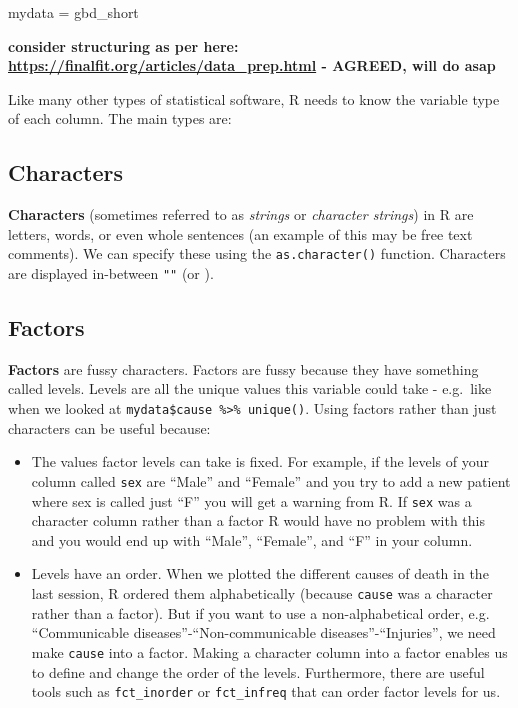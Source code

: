 \documentclass[12pt,]{krantz}
\makeatletter
\newenvironment{Shaded}{\begin{snugshade}}{\end{snugshade}}
\newcommand{\NormalTok}[1]{#1}
\newcommand{\StringTok}[1]{\textcolor[rgb]{0.31,0.60,0.02}{#1}}
\providecommand{\tightlist}{%
  \setlength{\itemsep}{0pt}\setlength{\parskip}{0pt}}
\newenvironment{kframe}{%
\medskip{}
\setlength{\fboxsep}{.8em}
 \def\at@end@of@kframe{}%
 \ifinner\ifhmode%
  \def\at@end@of@kframe{\end{minipage}}%
  \begin{minipage}{\columnwidth}%
 \fi\fi%
 \def\FrameCommand##1{\hskip\@totalleftmargin \hskip-\fboxsep
 \colorbox{shadecolor}{##1}\hskip-\fboxsep
     \hskip-\linewidth \hskip-\@totalleftmargin \hskip\columnwidth}%
 \MakeFramed {\advance\hsize-\width
   \@totalleftmargin\z@ \linewidth\hsize
   \@setminipage}}%
 {\par\unskip\endMakeFramed%
 \at@end@of@kframe}
\renewenvironment{Shaded}{\begin{kframe}}{\end{kframe}}
\theoremstyle{definition}
\theoremstyle{definition}
\theoremstyle{definition}
\theoremstyle{remark}
\makeatother
\begin{document}
\begin{Shaded}
\begin{Highlighting}[]
\NormalTok{mydata =}\StringTok{ }\NormalTok{gbd_short}
\end{Highlighting}
\end{Shaded}

\textbf{consider structuring as per here:
\url{https://finalfit.org/articles/data_prep.html} - AGREED, will do
asap}

Like many other types of statistical software, R needs to know the
variable type of each column. The main types are:

\hypertarget{characters}{%
\subsection{Characters}\label{characters}}

\textbf{Characters} (sometimes referred to as \emph{strings} or
\emph{character strings}) in R are letters, words, or even whole
sentences (an example of this may be free text comments). We can specify
these using the \texttt{as.character()} function. Characters are
displayed in-between \texttt{""} (or
\texttt{\textquotesingle{}\textquotesingle{}}).

\hypertarget{factors}{%
\subsection{Factors}\label{factors}}

\textbf{Factors} are fussy characters. Factors are fussy because they
have something called levels. Levels are all the unique values this
variable could take - e.g.~like when we looked at
\texttt{mydata\$cause\ \%\textgreater{}\%\ unique()}. Using factors
rather than just characters can be useful because:

\begin{itemize}
\tightlist
\item
  The values factor levels can take is fixed. For example, if the levels
  of your column called \texttt{sex} are ``Male'' and ``Female'' and you
  try to add a new patient where sex is called just ``F'' you will get a
  warning from R. If \texttt{sex} was a character column rather than a
  factor R would have no problem with this and you would end up with
  ``Male'', ``Female'', and ``F'' in your column.
\item
  Levels have an order. When we plotted the different causes of death in
  the last session, R ordered them alphabetically (because
  \texttt{cause} was a character rather than a factor). But if you want
  to use a non-alphabetical order, e.g. ``Communicable
  diseases''-``Non-communicable diseases''-``Injuries'', we need make
  \texttt{cause} into a factor. Making a character column into a factor
  enables us to define and change the order of the levels. Furthermore,
  there are useful tools such as \texttt{fct\_inorder} or
  \texttt{fct\_infreq} that can order factor levels for us.
\end{itemize}
\end{document}
